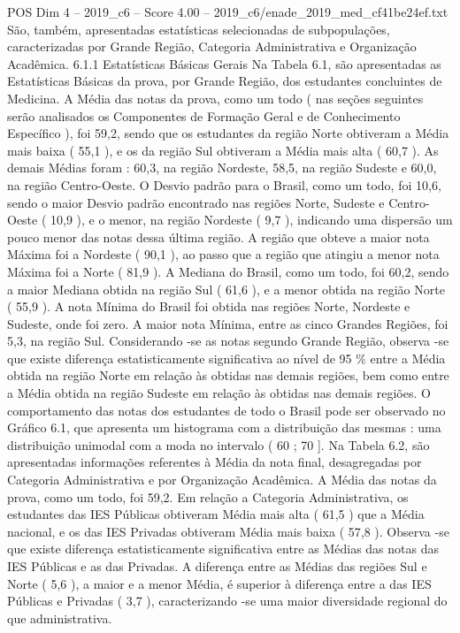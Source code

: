 \begin{textsample}{POS Dim 4 – 2019\_c6 – Score 4.00 – 2019\_c6/enade\_2019\_med\_cf41be24ef.txt}
São, também, apresentadas estatísticas selecionadas de subpopulações, caracterizadas por Grande Região, Categoria Administrativa e Organização Acadêmica. 6.1.1 Estatísticas Básicas Gerais Na Tabela 6.1, são apresentadas as Estatísticas Básicas da prova, por Grande Região, dos estudantes concluintes de Medicina.
A Média das notas da prova, como um todo ( nas seções seguintes serão analisados os Componentes de Formação Geral e de Conhecimento Específico ), foi 59,2, sendo que os estudantes da região Norte obtiveram a Média mais baixa ( 55,1 ), e os da região Sul obtiveram a Média mais alta ( 60,7 ).
As demais Médias foram : 60,3, na região Nordeste, 58,5, na região Sudeste e 60,0, na região Centro-Oeste.
O Desvio padrão para o Brasil, como um todo, foi 10,6, sendo o maior Desvio padrão encontrado nas regiões Norte, Sudeste e Centro-Oeste ( 10,9 ), e o menor, na região Nordeste ( 9,7 ), indicando uma dispersão um pouco menor das notas dessa última região.
A região que obteve a maior nota Máxima foi a Nordeste ( 90,1 ), ao passo que a região que atingiu a menor nota Máxima foi a Norte ( 81,9 ).
A Mediana do Brasil, como um todo, foi 60,2, sendo a maior Mediana obtida na região Sul ( 61,6 ), e a menor obtida na região Norte ( 55,9 ).
A nota Mínima do Brasil foi obtida nas regiões Norte, Nordeste e Sudeste, onde foi zero.
A maior nota Mínima, entre as cinco Grandes Regiões, foi 5,3, na região Sul.
Considerando -se as notas segundo Grande Região, observa -se que existe diferença estatisticamente significativa ao nível de 95 \% entre a Média obtida na região Norte em relação às obtidas nas demais regiões, bem como entre a Média obtida na região Sudeste em relação às obtidas nas demais regiões.
O comportamento das notas dos estudantes de todo o Brasil pode ser observado no Gráfico 6.1, que apresenta um histograma com a distribuição das mesmas : uma distribuição unimodal com a moda no intervalo ( 60 ; 70 ].
Na Tabela 6.2, são apresentadas informações referentes à Média da nota final, desagregadas por Categoria Administrativa e por Organização Acadêmica.
A Média das notas da prova, como um todo, foi 59,2.
Em relação a Categoria Administrativa, os estudantes das IES Públicas obtiveram Média mais alta ( 61,5 ) que a Média nacional, e os das IES Privadas obtiveram Média mais baixa ( 57,8 ).
Observa -se que existe diferença estatisticamente significativa entre as Médias das notas das IES Públicas e as das Privadas.
A diferença entre as Médias das regiões Sul e Norte ( 5,6 ), a maior e a menor Média, é superior à diferença entre a das IES Públicas e Privadas ( 3,7 ), caracterizando -se uma maior diversidade regional do que administrativa.

\end{textsample}
